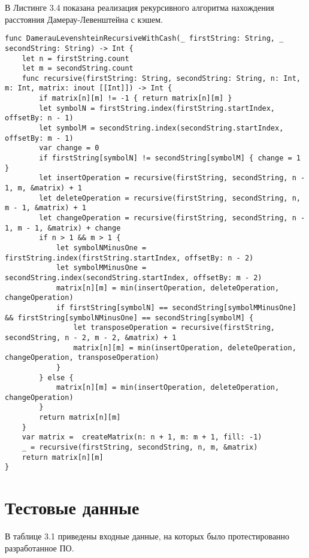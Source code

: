 В Листинге 3.4 показана реализация рекурсивного алгоритма нахождения расстояния Дамерау-Левенштейна с кэшем.
\begin{lstlisting}[caption=Функция нахождения расстояния Дамерау-Левенштейна рекурсивно с кэшем]
func DamerauLevenshteinRecursiveWithCash(_ firstString: String, _ secondString: String) -> Int {
    let n = firstString.count
    let m = secondString.count
    func recursive(firstString: String, secondString: String, n: Int, m: Int, matrix: inout [[Int]]) -> Int {
        if matrix[n][m] != -1 { return matrix[n][m] }
        let symbolN = firstString.index(firstString.startIndex, offsetBy: n - 1)
        let symbolM = secondString.index(secondString.startIndex, offsetBy: m - 1)
        var change = 0
        if firstString[symbolN] != secondString[symbolM] { change = 1 }
        let insertOperation = recursive(firstString, secondString, n - 1, m, &matrix) + 1
        let deleteOperation = recursive(firstString, secondString, n, m - 1, &matrix) + 1
        let changeOperation = recursive(firstString, secondString, n - 1, m - 1, &matrix) + change
        if n > 1 && m > 1 {
            let symbolNMinusOne = firstString.index(firstString.startIndex, offsetBy: n - 2)
            let symbolMMinusOne = secondString.index(secondString.startIndex, offsetBy: m - 2)
            matrix[n][m] = min(insertOperation, deleteOperation, changeOperation)
            if firstString[symbolN] == secondString[symbolMMinusOne] && firstString[symbolNMinusOne] == secondString[symbolM] {
                let transposeOperation = recursive(firstString, secondString, n - 2, m - 2, &matrix) + 1
                matrix[n][m] = min(insertOperation, deleteOperation, changeOperation, transposeOperation)
            }
        } else {
            matrix[n][m] = min(insertOperation, deleteOperation, changeOperation)
        }
        return matrix[n][m]
    }
    var matrix =  createMatrix(n: n + 1, m: m + 1, fill: -1)
    _ = recursive(firstString, secondString, n, m, &matrix)
    return matrix[n][m]
}
\end{lstlisting}

\section{Тестовые данные}

В таблице 3.1 приведены входные данные, на которых было протестированно разработанное ПО.

